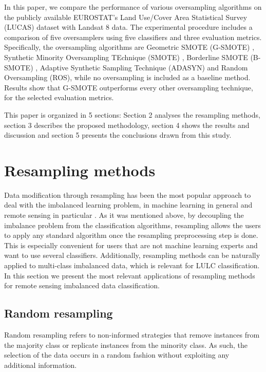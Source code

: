 \documentclass[remotesensing,article,submit,moreauthors,pdftex]{Definitions/mdpi}
\begin{document}
In this paper, we compare the performance of various oversampling algorithms on
the publicly available EUROSTAT's Land Use/Cover Area Statistical Survey
(LUCAS) dataset \cite{LUCAS2015C3} with Landsat 8 data. The experimental 
procedure includes a comparison of five oversamplers using five classifiers and 
three evaluation metrics. Specifically, the oversampling algorithms are 
Geometric SMOTE (G-SMOTE) \cite{Douzas2019}, Synthetic Minority Oversampling 
TEchnique (SMOTE) \cite{Chawla2002}, Borderline SMOTE (B-SMOTE) \cite{Han2005}, 
Adaptive Synthetic Sampling Technique (ADASYN) \cite{HaiboHe2008} and Random 
Oversampling (ROS), while no oversampling is included as a baseline method. 
Results show that G-SMOTE outperforms every other oversampling technique, for 
the selected evaluation metrics.

This paper is organized in 5 sections: Section 2 analyses the resampling methods,
section 3 describes the proposed methodology, section 4 shows the results and
discussion and section 5 presents the conclusions drawn from this study.

\section{Resampling methods}

Data modification through resampling has been the most popular approach to deal
with the imbalanced learning problem, in machine learning in general and remote
sensing in particular \cite{Feng2019}. As it was mentioned above, by decoupling
the imbalance problem from the classification algorithms, resampling allows the
users to apply any standard algorithm once the resampling preprocessing step is
done. This is especially convenient for users that are not machine learning
experts and want to use several classifiers. Additionally, resampling methods
can be naturally applied to multi-class imbalanced data, which is relevant for
LULC classification. In this section we present the most relevant applications
of resampling methods for remote sensing imbalanced data classification.

\subsection{Random resampling}

Random resampling refers to non-informed strategies that remove instances from
the majority class or replicate instances from the minority class. As such, the
selection of the data occurs in a random fashion without exploiting any
additional information.
\end{document}
